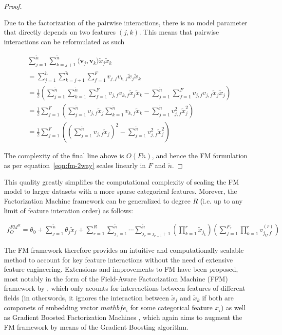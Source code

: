 \documentclass{mldsmsc}
\begin{document}
\begin{proof}
\label{prf:fm-linearity}

Due to the factorization of the pairwise interactions, there is no model
parameter that directly depends on two features $(j,k)$. This means that
pairwise interactions can be reformulated as such

\begin{align*}
    &\sum_{j=1}^{\tilde{n}} \sum_{k=j+1}^{\tilde{n}} \langle \mathbf{v}_j , \mathbf{v}_k \rangle \tilde{x}_j \tilde{x}_k \\
    &= \sum_{j=1}^{\tilde{n}} \sum_{k=j+1}^{\tilde{n}} 
    \sum_{f=1}^{F}v_{j,f} v_{k,f}\tilde{x}_j \tilde{x}_k \\
    &= \frac{1}{2} \left( \sum_{j=1}^{\tilde{n}} \sum_{k=1}^{\tilde{n}}
    \sum_{f=1}^{F} v_{j,f} v_{k,f} \tilde{x}_j \tilde{x}_k -
    \sum_{j=1}^{\tilde{n}} \sum_{f=1}^{F}v_{j,f} v_{j,f} \tilde{x}_j \tilde{x}_j \right)\\
    &=\frac{1}{2}\sum_{f=1}^{F} \left( \sum_{j=1}^{\tilde{n}}v_{j,f} \tilde{x}_j
    \sum_{k=1}^{\tilde{n}} v_{k,f} \tilde{x}_k - \sum_{j=1}^{\tilde{n}}
    v_{j,f}^2 \tilde{x}_j^2 \right)\\
    &= \frac{1}{2}\sum_{f=1}^{F} \left( \left(\sum_{j=1}^{\tilde{n}}v_{j,f} \tilde{x}_j\right)^2
    - \sum_{j=1}^{\tilde{n}} v_{j,f}^2 \tilde{x}_j^2 \right)
\end{align*}

The complexity of the final line above is $O(F\tilde{n})$, and hence the FM formulation
as per equation~\ref{eqn:fm-2way} scales linearly in $F$ and $\tilde{n}$.
\end{proof}

This quality greatly simplifies the computational complexity of scaling the FM model to larger
datasets with a more sparse categorical features. Morever, the Factorization Machine framework
can be generalized to degree $R$ (i.e. up to any limit of feature interation order) as follows:

\begin{multline}
\label{eqn:fm-rway}
f_{\Theta}^{FM^R} = \theta_0 + \sum_{j=1}^{\tilde{n}} \theta_{j} \tilde{x}_{j}
+ \sum_{r=1}^{R} \sum_{j_1=1}^{\tilde{n}} \cdots \sum_{j_r = j_{r-1} + 1}^{\tilde{n}}
\left( \prod_{k=1}^{r} \tilde{x}_{j_k} \right)
\left( \sum_{f = 1}^{F_r} \prod_{k=1}^{r} v_{j_k, f}^{(r)}\right)
\end{multline}

The FM framework therefore provides an intuitive and computationally scalable method to
account for key feature interactions without the need of extensive feature engineering. Extensions
and improvements to FM have been proposed, most notably in the form of
the Field-Aware Factorization Machine (FFM) framework by \cite{RefWorks:juan2016field-aware},
which only acounts for intereactions between features of different fields 
(in otherwords, it ignores the interaction between $\tilde{x}_j$ and $\tilde{x}_k$ if
both are componets of embedding vector $mathbf{e}_i$ for some categorical feature $x_i$)
as well as Gradient Boosted Factorization Machines \citep{RefWorks:cheng2014gradient}, 
which again aims to augment the FM framework by means of the Gradient Boosting algorithm.
\end{document}
